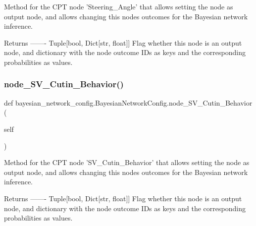 \begin{DoxyVerb}Method for the CPT node 'Steering_Angle' that allows setting the node as output node, 
and allows changing this nodes outcomes for the Bayesian network inference.

Returns
-------
Tuple[bool, Dict[str, float]]
    Flag whether this node is an output node, and dictionary with the node outcome IDs as keys 
    and the corresponding probabilities as values.
\end{DoxyVerb}
 \mbox{\label{classbayesian__network__config_1_1_bayesian_network_config_a6510c23dac8fb0c36ee38283e5815d54}} 
\subsubsection{\texorpdfstring{node\+\_\+\+S\+V\+\_\+\+Cutin\+\_\+\+Behavior()}{node\_SV\_Cutin\_Behavior()}\hspace{0.1cm}{\footnotesize\ttfamily [1/2]}}
{\footnotesize\ttfamily def bayesian\+\_\+network\+\_\+config.\+Bayesian\+Network\+Config.\+node\+\_\+\+S\+V\+\_\+\+Cutin\+\_\+\+Behavior (\begin{DoxyParamCaption}\item[{}]{self }\end{DoxyParamCaption})}

\begin{DoxyVerb}Method for the CPT node 'SV_Cutin_Behavior' that allows setting the node as output node,
and allows changing this nodes outcomes for the Bayesian network inference.

Returns
-------
Tuple[bool, Dict[str, float]]
    Flag whether this node is an output node, and dictionary with the node outcome IDs as keys
    and the corresponding probabilities as values.
\end{DoxyVerb}
 \mbox{\label{classbayesian__network__config_1_1_bayesian_network_config_a6510c23dac8fb0c36ee38283e5815d54}} 
